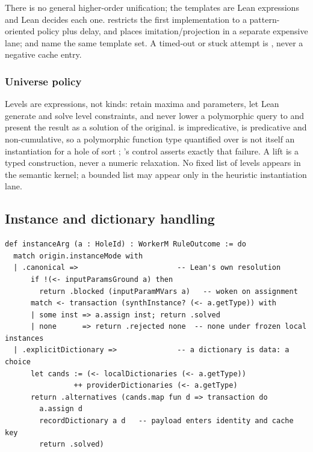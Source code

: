 There is no general higher-order unification; the templates are Lean expressions and Lean decides each one.  restricts the first implementation to a pattern-oriented policy plus delay, and places imitation/projection in a separate expensive lane;  and  name the same template set. A timed-out or stuck attempt is , never a negative cache entry.

\subsubsection{Universe policy}

Levels are expressions, not kinds: retain maxima and parameters, let Lean generate and solve level constraints, and never lower a polymorphic query to  and present the result as a solution of the original.  is impredicative,  is predicative and non-cumulative, so a polymorphic function type quantified over  is not itself an instantiation for a hole of sort ; 's  control asserts exactly that failure. A lift is a typed construction, never a numeric relaxation. No fixed list of levels appears in the semantic kernel; a bounded list may appear only in the heuristic instantiation lane.

\subsection{Instance and dictionary handling}\label{alg:instances}

\begin{lstlisting}
def instanceArg (a : HoleId) : WorkerM RuleOutcome := do
  match origin.instanceMode with
  | .canonical =>                       -- Lean's own resolution
      if !(<- inputParamsGround a) then
        return .blocked (inputParamMVars a)   -- woken on assignment
      match <- transaction (synthInstance? (<- a.getType)) with
      | some inst => a.assign inst; return .solved
      | none      => return .rejected none  -- none under frozen local instances
  | .explicitDictionary =>              -- a dictionary is data: a choice
      let cands := (<- localDictionaries (<- a.getType))
                ++ providerDictionaries (<- a.getType)
      return .alternatives (cands.map fun d => transaction do
        a.assign d
        recordDictionary a d   -- payload enters identity and cache key
        return .solved)
\end{lstlisting}

